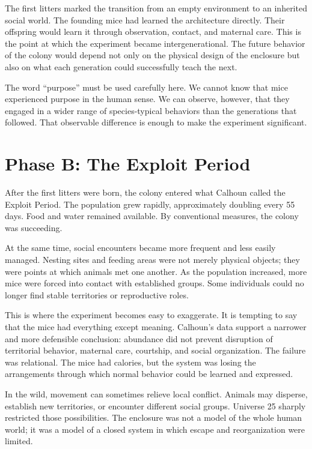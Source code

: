 ﻿\documentclass[12pt,a4paper]{book}
\begin{document}
The first litters marked the transition from an empty environment to an inherited social world. The founding mice had learned the architecture directly. Their offspring would learn it through observation, contact, and maternal care. This is the point at which the experiment became intergenerational. The future behavior of the colony would depend not only on the physical design of the enclosure but also on what each generation could successfully teach the next.

The word ``purpose'' must be used carefully here. We cannot know that mice experienced purpose in the human sense. We can observe, however, that they engaged in a wider range of species-typical behaviors than the generations that followed. That observable difference is enough to make the experiment significant.

\section{Phase B: The Exploit Period}

After the first litters were born, the colony entered what Calhoun called the Exploit Period. The population grew rapidly, approximately doubling every 55 days. Food and water remained available. By conventional measures, the colony was succeeding.

At the same time, social encounters became more frequent and less easily managed. Nesting sites and feeding areas were not merely physical objects; they were points at which animals met one another. As the population increased, more mice were forced into contact with established groups. Some individuals could no longer find stable territories or reproductive roles.

This is where the experiment becomes easy to exaggerate. It is tempting to say that the mice had everything except meaning. Calhoun's data support a narrower and more defensible conclusion: abundance did not prevent disruption of territorial behavior, maternal care, courtship, and social organization. The failure was relational. The mice had calories, but the system was losing the arrangements through which normal behavior could be learned and expressed.

In the wild, movement can sometimes relieve local conflict. Animals may disperse, establish new territories, or encounter different social groups. Universe 25 sharply restricted those possibilities. The enclosure was not a model of the whole human world; it was a model of a closed system in which escape and reorganization were limited.
\end{document}
